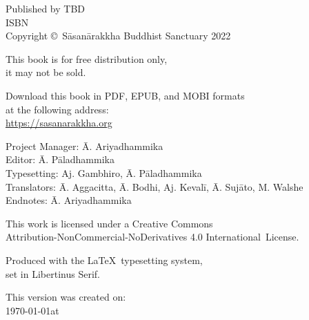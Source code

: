\cleartoverso
\thispagestyle{empty}

\vspace*{-\baselineskip}

{%

\fontsize{10}{16}\selectfont
\centering
\setlength{\parindent}{0pt}%

\vspace{0.5cm}

Published by TBD\\
ISBN \theISBN\\
Copyright \copyright\ Sāsanārakkha Buddhist Sanctuary 2022

\vspace{0.5cm}

This book is for free distribution only,\\
it may not be sold.

\vspace{0.5cm}

Download this book in PDF, EPUB, and MOBI formats\\
at the following address:\\
\href{https://sasanarakkha.org/}{https://sasanarakkha.org}

\vspace{0.5cm}

Project Manager: Ā. Ariyadhammika\\
Editor: Ā. Pāladhammika\\
Typesetting: Aj. Gambhiro, Ā. Pāladhammika\\
Translators: Ā. Aggacitta, Ā. Bodhi, Aj. Kevalī, Ā. Sujāto, M. Walshe\\
Endnotes: Ā. Ariyadhammika

\vspace{0.5cm}

This work is licensed under a Creative Commons\\
Attribution-NonCommercial-NoDerivatives 4.0 International~License.

Produced with the \LaTeX\ typesetting system,\\
set in Libertinus Serif.

\vspace{0.5cm}

\ifdesktopversion
This version was created on:\\
\today \space at \currenttime
\fi

\vspace{0.5cm}


\theEditionInfo

}
